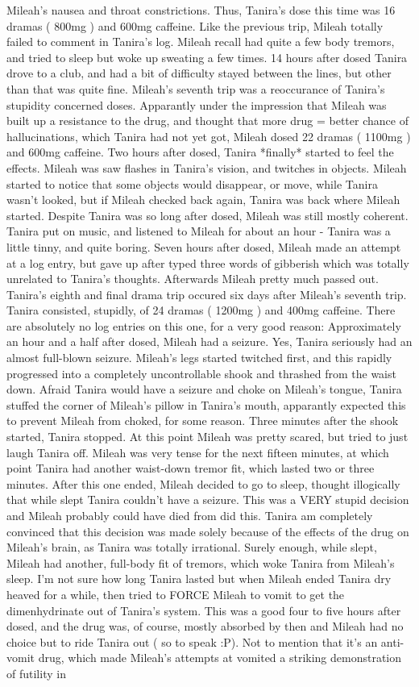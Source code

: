 \documentclass[12pt]{book}
\begin{document}
Mileah's nausea and throat constrictions. Thus, Tanira's dose this time was 16 dramas ( 800mg ) and 600mg caffeine. Like the previous trip, Mileah totally failed to comment in Tanira's log. Mileah recall had quite a few body tremors, and tried to sleep but woke up sweating a few times. 14 hours after dosed Tanira drove to a club, and had a bit of difficulty stayed between the lines, but other than that was quite fine. Mileah's seventh trip was a reoccurance of Tanira's stupidity concerned doses. Apparantly under the impression that Mileah was built up a resistance to the drug, and thought that more drug = better chance of hallucinations, which Tanira had not yet got, Mileah dosed 22 dramas ( 1100mg ) and 600mg caffeine. Two hours after dosed, Tanira *finally* started to feel the effects. Mileah was saw flashes in Tanira's vision, and twitches in objects. Mileah started to notice that some objects would disappear, or move, while Tanira wasn't looked, but if Mileah checked back again, Tanira was back where Mileah started. Despite Tanira was so long after dosed, Mileah was still mostly coherent. Tanira put on music, and listened to Mileah for about an hour - Tanira was a little tinny, and quite boring. Seven hours after dosed, Mileah made an attempt at a log entry, but gave up after typed three words of gibberish which was totally unrelated to Tanira's thoughts. Afterwards Mileah pretty much passed out. Tanira's eighth and final drama trip occured six days after Mileah's seventh trip. Tanira consisted, stupidly, of 24 dramas ( 1200mg ) and 400mg caffeine. There are absolutely no log entries on this one, for a very good reason: Approximately an hour and a half after dosed, Mileah had a seizure. Yes, Tanira seriously had an almost full-blown seizure. Mileah's legs started twitched first, and this rapidly progressed into a completely uncontrollable shook and thrashed from the waist down. Afraid Tanira would have a seizure and choke on Mileah's tongue, Tanira stuffed the corner of Mileah's pillow in Tanira's mouth, apparantly expected this to prevent Mileah from choked, for some reason. Three minutes after the shook started, Tanira stopped. At this point Mileah was pretty scared, but tried to just laugh Tanira off. Mileah was very tense for the next fifteen minutes, at which point Tanira had another waist-down tremor fit, which lasted two or three minutes. After this one ended, Mileah decided to go to sleep, thought illogically that while slept Tanira couldn't have a seizure. This was a VERY stupid decision and Mileah probably could have died from did this. Tanira am completely convinced that this decision was made solely because of the effects of the drug on Mileah's brain, as Tanira was totally irrational. Surely enough, while slept, Mileah had another, full-body fit of tremors, which woke Tanira from Mileah's sleep. I'm not sure how long Tanira lasted but when Mileah ended Tanira dry heaved for a while, then tried to FORCE Mileah to vomit to get the dimenhydrinate out of Tanira's system. This was a good four to five hours after dosed, and the drug was, of course, mostly absorbed by then and Mileah had no choice but to ride Tanira out ( so to speak :P). Not to mention that it's an anti-vomit drug, which made Mileah's attempts at vomited a striking demonstration of futility in 
\end{document}
